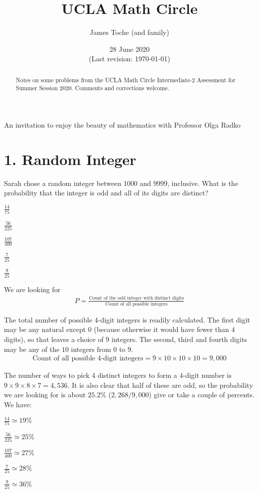 \documentclass[12pt]{article}
\title{UCLA Math Circle}
\author{James Toche (and family)}
\date{28 June 2020 \\(Last revision: \today)}
\begin{document}
\epigraph{An invitation to enjoy the beauty of mathematics with Professor Olga Radko}{}
\begin{minipage}{\textwidth}
\maketitle
\begin{abstract}
Notes on some problems from the UCLA Math Circle Intermediate-2 Assessment for Summer Session 2020. Comments and corrections welcome. 
\end{abstract}
\end{minipage}

\section*{1. Random Integer}
\begin{question}
Sarah chose a random integer between 1000 and 9999, inclusive. What is the probability that the integer is odd and all of its digits are distinct?
\begin{enumerate*}
  \item $\frac{14}{75}$
  \item $\frac{56}{225}$
  \item $\frac{107}{400}$
  \item $\frac{7}{25}$
  \item $\frac{9}{25}$
\end{enumerate*}
\end{question}

We are looking for
\begin{align*}
P = \frac{\text{Count of the odd integer with distinct digits}}{\text{Count of all possible integers}}
\end{align*}

The total number of possible $4$-digit integers is readily calculated. The first digit may be any natural except $0$ (because otherwise it would have fewer than $4$ digits), so that leaves a choice of $9$ integers. The second, third and fourth digits may be any of the $10$ integers from $0$ to $9$. 
\begin{align*}
\text{Count of all possible 4-digit integers} = 9 \times 10 \times 10 \times 10 = 9,000
\end{align*}

The number of ways to pick $4$ distinct integers to form a $4$-digit number is $9\times9\times8\times7=4,536$. It is also clear that half of these are odd, so the probability we are looking for is about $25.2\%$ ($2,268/9,000$) give or take a couple of percents. We have:
\begin{question}
\begin{enumerate*}
  \item $\frac{14}{75} \simeq 19\%$
  \item $\frac{56}{225} \simeq 25\%$
  \item $\frac{107}{400} \simeq 27\%$
  \item $\frac{7}{25} \simeq 28\%$
  \item $\frac{9}{25} \simeq 36\%$
\end{enumerate*}
\end{question}
\end{document}

